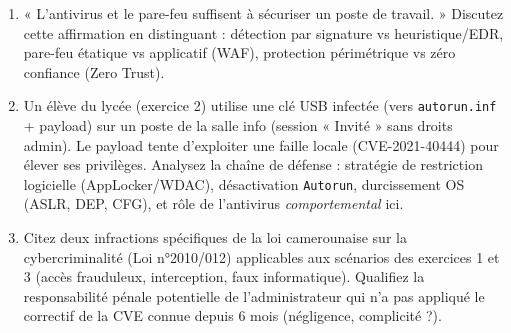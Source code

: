 \documentclass[11pt]{article}
\begin{document}
\begin{exercice}
\begin{enumerate}
    \item « L'antivirus et le pare-feu suffisent à sécuriser un poste de travail. » Discutez cette affirmation en distinguant : détection par signature vs heuristique/EDR, pare-feu étatique vs applicatif (WAF), protection périmétrique vs zéro confiance (Zero Trust).
    \item Un élève du lycée (exercice 2) utilise une clé USB infectée (vers \texttt{autorun.inf} + payload) sur un poste de la salle info (session « Invité » sans droits admin). Le payload tente d'exploiter une faille locale (CVE-2021-40444) pour élever ses privilèges. Analysez la chaîne de défense : stratégie de restriction logicielle (AppLocker/WDAC), désactivation \texttt{Autorun}, durcissement OS (ASLR, DEP, CFG), et rôle de l'antivirus \textit{comportemental} ici.
    \item Citez deux infractions spécifiques de la loi camerounaise sur la cybercriminalité (Loi n°2010/012) applicables aux scénarios des exercices 1 et 3 (accès frauduleux, interception, faux informatique). Qualifiez la responsabilité pénale potentielle de l'administrateur qui n'a pas appliqué le correctif de la CVE connue depuis 6 mois (négligence, complicité ?).
\end{enumerate}
\end{exercice}
\end{document}
